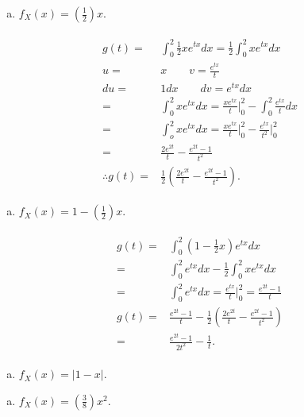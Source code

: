 \documentclass{article}
\begin{document}
\begin{enumerate}[(b)]
\item $f_X (x) = \left(\frac{1}{2}\right)x$.
\end{enumerate}

\begin{eqnarray}
\label{eq4}
\begin{split}
g(t)=& \int_0^{2} \frac{1}{2}xe^{tx}dx = \frac{1}{2}\int_0^2 xe^{tx}dx\\
u =& x \qquad v = \frac{e^{tx}}{t}\\
du = & 1dx \qquad dv = e^{tx}dx\\
= & \int_0^2 xe^{tx}dx = \frac{xe^{tx}}{t} \Bigr \rvert_0^2- \int_0^2 \frac{e^{tx}}{t}dx\\
= & \int_o^2 xe^{tx}dx = \frac{xe^{tx}}{t} \Bigr \rvert_0^2 - \frac{e^{tx}}{t^2} \Bigr \rvert_0^2\\
= & \frac{2e^{2t}}{t} - \frac{e^{2t} -1}{t^2}\\
\therefore g(t) = & \frac{1}{2} \left( \frac{2e^{2t}}{t} - \frac{e^{2t}-1}{t^2} \right).
\end{split}
\end{eqnarray}


\begin{enumerate}[(c)]
\item $f_X (x) = 1 -  \left(\frac{1}{2}\right)x$.
\end{enumerate}

\begin{eqnarray}
\label{eq5}
\begin{split}
g(t) = & \int_0^2 \left( 1 - \frac{1}{2} x \right) e^{tx}dx \\
= & \int_0^2 e^{tx} dx - \frac{1}{2}\int_0^2 xe^{tx}dx\\
= & \int_0^2 e^{tx}dx = \frac{e^{tx}}{t}\Bigr \rvert_0^2 = \frac{e^{2t}-1}{t}\\
g(t) =& \frac{e^{2t}-1}{t} - \frac{1}{2} \left(\frac{2e^{2t}}{t} - \frac{e^{2t}-1}{t^2} \right)\\
= & \frac{e^{2t}- 1}{2t^2} - \frac{1}{t}.
\end{split}
\end{eqnarray}

\begin{enumerate}[(d)]
\item $f_X (x) = \lvert 1 - x \rvert$.
\end{enumerate}

\begin{enumerate}[(e)]
\item $f_X (x) = \left(\frac{3}{8}\right)x^2$.
\end{enumerate}
\end{document}
